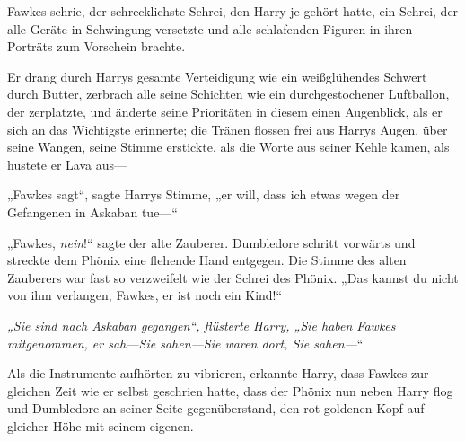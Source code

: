 Fawkes schrie, der schrecklichste Schrei, den Harry je gehört hatte, ein Schrei, der alle Geräte in Schwingung versetzte und alle schlafenden Figuren in ihren Porträts zum Vorschein brachte.

Er drang durch Harrys gesamte Verteidigung wie ein weißglühendes Schwert durch Butter, zerbrach alle seine Schichten wie ein durchgestochener Luftballon, der zerplatzte, und änderte seine Prioritäten in diesem einen Augenblick, als er sich an das Wichtigste erinnerte; die Tränen flossen frei aus Harrys Augen, über seine Wangen, seine Stimme erstickte, als die Worte aus seiner Kehle kamen, als hustete er Lava aus—

„Fawkes sagt“, sagte Harrys Stimme, „er will, dass ich etwas wegen der Gefangenen in Askaban tue—“

„Fawkes, \emph{nein}!“ sagte der alte Zauberer. Dumbledore schritt vorwärts und streckte dem Phönix eine flehende Hand entgegen. Die Stimme des alten Zauberers war fast so verzweifelt wie der Schrei des Phönix. „Das kannst du nicht von ihm verlangen, Fawkes, er ist noch ein Kind!“

\emph{„Sie sind nach Askaban gegangen“, flüsterte Harry, „Sie haben Fawkes mitgenommen, er sah—\emph{Sie} sahen—Sie waren \emph{dort}, Sie sahen—}“

Als die Instrumente aufhörten zu vibrieren, erkannte Harry, dass Fawkes zur gleichen Zeit wie er selbst geschrien hatte, dass der Phönix nun neben Harry flog und Dumbledore an seiner Seite gegenüberstand, den rot-goldenen Kopf auf gleicher Höhe mit seinem eigenen.

